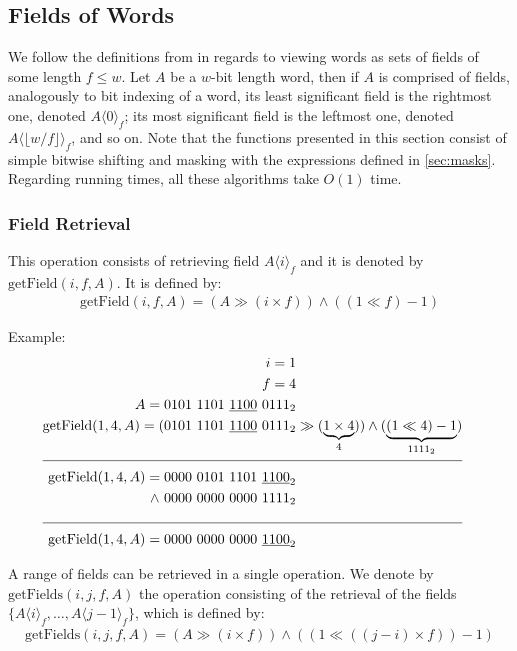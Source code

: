 \newpage
\subsection{Fields of Words} \label{sec:fieldsOfWords}

We follow the definitions from \cite{patrascu2014dynamic} in regards to viewing words as sets of fields of some length $f \leq w$. Let $A$ be a $w$-bit length word, then if $A$ is comprised of fields, analogously to bit indexing of a word, its least significant field is the rightmost one, denoted $A\langle0\rangle_f$; its most significant field is the leftmost one, denoted $A\langle \lfloor w/f \rfloor \rangle_f$, and so on.
Note that the functions presented in this section consist of simple bitwise shifting and masking with the expressions defined in \ref{sec:masks}. Regarding running times, all these algorithms take $O(1)$ time.

\subsubsection{Field Retrieval} \label{sec:fieldRetrieval}

This operation consists of retrieving field $A\langle i\rangle_f$ and it is denoted by $\text{getField}(i, f, A)$. It is defined by:
\begin{align*}
    \text{getField}(i, f, A) = (A \gg (i \times f)) \wedge ((1 \ll f) - 1)
\end{align*}

Example:
\begin{align*}
    i = 1\\
    f = 4\\
    A = 0101\ 1101\ \underline{1100}\ 0111_2& \\
    \text{getField}(1, 4, A) = (0101\ 1101\ \underline{1100}\ 0111_2& \gg (\underbrace{1 \times 4}_{4})) \wedge (\underbrace{(1 \ll 4) - 1}_{1111_2})\\
    \cline{1-2}
    \text{getField}(1, 4, A) = 0000\ 0101\ 1101\ \underline{1100}_2& \\
    \wedge\ 0000\ 0000\ 0000\ 1111_2& \\
    \cline{1-2}
    \text{getField}(1, 4, A) = 0000\ 0000\ 0000\ \underline{1100}_2&
\end{align*}

A range of fields can be retrieved in a single operation. We denote by $\text{getFields}(i, j, f, A)$ the operation consisting of the retrieval of the fields $\{A\langle i\rangle_f,\dots , A\langle j-1\rangle_f\}$, which is defined by:
\begin{align*}
    \text{getFields}(i, j, f, A) = (A \gg (i \times f)) \wedge ((1 \ll ((j - i) \times f)) - 1)
\end{align*}

